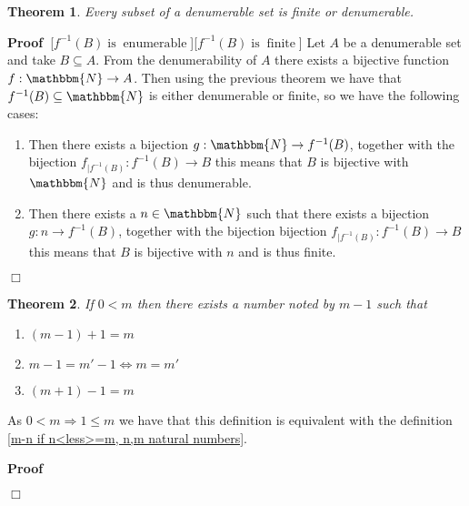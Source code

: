 \documentclass{book}
\newcommand{\tmop}[1]{\ensuremath{\operatorname{#1}}}
\newcommand{\um}{-}
\newcommand{\upl}{+}
\newenvironment{proof}{\noindent\textbf{Proof\ }}{\hspace*{\fill}$\Box$\medskip}
\newtheorem{theorem}{Theorem}
\begin{document}
{{\begin{theorem}
  \label{subsets of denumerable sets are finite or denumerable}Every subset of
  a denumerable set is finite or denumerable.
\end{theorem}

\begin{proof}[$f^{- 1} (B) \tmop{is} \tmop{enumerable}$][$f^{- 1} (B)
\tmop{is} \tmop{finite}$]
  Let $A$ be a denumerable set and take $B \subseteq A$. From the
  denumerability of $A$ there exists a bijective function $f : \mathbbm{N}
  \rightarrow A$. Then using the previous theorem we have that $f^{- 1} (B)
  \subseteq \mathbbm{N}$ is either denumerable or finite, so we have the
  following cases:
  \begin{enumerate}
    \item Then there exists a bijection $g : \mathbbm{N} \rightarrow f^{- 1}
    (B)$, together with the bijection $f_{|f^{- 1} (B)} : f^{- 1} (B)
    \rightarrow B$ this means that $B$ is bijective with $\mathbbm{N}$ and is
    thus denumerable.
    
    \item Then there exists a $n \in \mathbbm{N}$ such that there exists a
    bijection $g : n \rightarrow f^{- 1} (B)$, together with the bijection
    bijection $f_{|f^{- 1} (B)} : f^{- 1} (B) \rightarrow B$ this means that
    $B$ is bijective with $n$ and is thus finite.
  \end{enumerate}
  
\end{proof}

\begin{theorem}
  If $0 < m$ then there exists a number noted by $m \um 1$ such that
  \begin{enumerate}
    \item $(m \um 1) \upl 1 = m$
    
    \item $m \um 1 = m' \um 1 \Leftrightarrow m = m'$
    
    \item $(m \upl 1) \um 1 = m$
  \end{enumerate}
\end{theorem}

\begin{note}
  As $0 < m \Rightarrow 1 \leqslant m$ we have that this definition is
  equivalent with the definition \ref{m-n if n<less>=m, n,m natural numbers}.
\end{note}

\begin{proof}
  

\end{proof}}}
\end{document}

